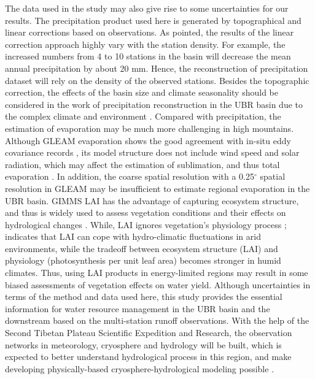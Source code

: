 \documentclass[hess, manuscript]{copernicus}
\begin{document}
The data used in the study may also give rise to some uncertainties for our results. The precipitation product used here is generated by topographical and linear corrections based on observations. As \citet{sun2020precipitation} pointed, the results of the linear correction approach highly vary with the station density. For example, the increased numbers from 4 to 10 stations in the basin will decrease the mean annual precipitation by about 20 mm. Hence, the reconstruction of precipitation dataset will rely on the density of the observed stations. Besides the topographic correction, the effects of the basin size and climate seasonality should be considered in the work of precipitation reconstruction in the UBR basin due to the complex climate and environment \citep{sun2019contrasting}. Compared with precipitation, the estimation of evaporation may be much more challenging in high mountains. Although GLEAM evaporation shows the good agreement with in-situ eddy covariance records \citep{yang2017multi}, its model structure does not include wind speed and solar radiation, which may affect the estimation of sublimation, and thus total evaporation \citep{li2019evapotranspiration}. 
In addition, the coarse spatial resolution with a 0.25$^{\circ}$ spatial resolution in GLEAM may be insufficient to estimate regional evaporation in the UBR basin.
GIMMS LAI has the advantage of capturing ecosystem structure, and thus is widely used to assess vegetation conditions and their effects on hydrological changes \citep{zhu2016greening,forzieri2020increased,gonsamo2021greening}. While, LAI ignores vegetation's physiology process \citep{fang2019overview}; \citet{hu2022decoupling} indicates that LAI can cope with hydro-climatic fluctuations in arid environments, while the tradeoff between ecosystem structure (LAI) and physiology (photosynthesis per unit leaf area) becomes stronger in humid climates. Thus, using LAI products in energy-limited regions may result in some biased assessments of vegetation effects on water yield.
Although uncertainties in terms of the method and data used here, this study provides the essential information for water resource management in the UBR basin and the downstream based on the multi-station runoff observations. With the help of the Second Tibetan Plateau Scientific Expedition and Research, the observation networks in meteorology, cryosphere and hydrology will be built, which is expected to better understand hydrological process in this region, and make developing physically-based cryosphere-hydrological modeling possible \citep{wang2022observing}.
\end{document}
